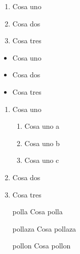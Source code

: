 \documentclass[a4paper,12pt]{article}
\begin{document}
\begin{enumerate}
\item Cosa uno
\item Cosa dos
\item Cosa tres
\end{enumerate}

\begin{itemize}
\item Cosa uno
\item Cosa dos
\item Cosa tres
\end{itemize}

\begin{enumerate}
\item Cosa uno
\begin{enumerate}
\item Cosa uno a
\item Cosa uno b
\item Cosa uno c
\end{enumerate}
\item Cosa dos
\item Cosa tres
\end{enumerate}

\begin{enumerate}
\item[polla] Cosa polla
\item[pollaza] Cosa pollaza
\item[pollon] Cosa pollon
\end{enumerate}
\end{document}
